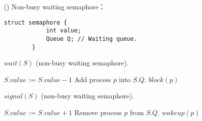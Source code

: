 \begin{theorem}{()} Non-busy waiting semaphore：
    \begin{lstlisting}[caption={Non-busy waiting semaphore.}, captionpos=b]
        struct semaphore {
            int value;
            Queue Q; // Waiting queue.
        }
    \end{lstlisting}
    \begin{algorithm}[H]
        \caption{$wait(S)$ (non-busy waiting semaphore).}
        \begin{algorithmic}[1]
                \State $S.value$ := $S.value - 1$
                    \State Add process $p$ into $S.Q$.
                    \State $block(p)$ 
                \EndIf
            \EndFunction
        \end{algorithmic}
    \end{algorithm}
    \begin{algorithm}[H]
        \caption{$signal(S)$ (non-busy waiting semaphore).}
        \begin{algorithmic}[1]
                \State $S.value$ := $S.value + 1$
                    \State Remove process $p$ from $S.Q$.
                    \State $wakeup(p)$ 
                \EndIf
            \EndFunction
        \end{algorithmic}
    \end{algorithm}
\end{theorem}

